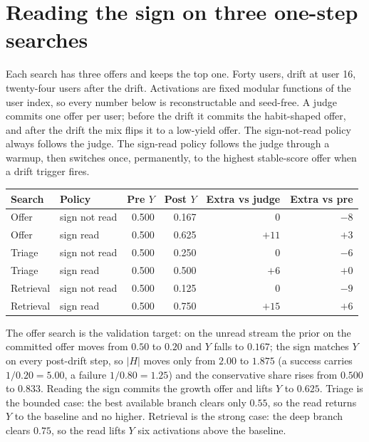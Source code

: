 \documentclass[11pt,a4paper]{article}
\begin{document}
\section{Reading the sign on three one-step searches}
Each search has three offers and keeps the top one.
Forty users, drift at user 16, twenty-four users after the drift.
Activations are fixed modular functions of the user index, so every number below is reconstructable and seed-free.
A judge commits one offer per user; before the drift it commits the habit-shaped offer, and after the drift the mix flips it to a low-yield offer.
The sign-not-read policy always follows the judge.
The sign-read policy follows the judge through a warmup, then switches once, permanently, to the highest stable-score offer when a drift trigger fires.
\begin{center}
\begin{tabular}{llrrrr}
\toprule
Search & Policy & Pre \(Y\) & Post \(Y\) & Extra vs judge & Extra vs pre \\
\midrule
Offer     & sign not read & 0.500 & 0.167 & 0    & \(-8\) \\
Offer     & sign read     & 0.500 & 0.625 & \(+11\) & \(+3\) \\
\addlinespace
Triage    & sign not read & 0.500 & 0.250 & 0    & \(-6\) \\
Triage    & sign read     & 0.500 & 0.500 & \(+6\)  & \(+0\) \\
\addlinespace
Retrieval & sign not read & 0.500 & 0.125 & 0    & \(-9\) \\
Retrieval & sign read     & 0.500 & 0.750 & \(+15\) & \(+6\) \\
\bottomrule
\end{tabular}
\end{center}
The offer search is the validation target: on the unread stream the prior on the committed offer moves from \(0.50\) to \(0.20\) and \(Y\) falls to \(0.167\); the sign matches \(Y\) on every post-drift step, so \(|H|\) moves only from \(2.00\) to \(1.875\) (a success carries \(1/0.20=5.00\), a failure \(1/0.80=1.25\)) and the conservative share rises from \(0.500\) to \(0.833\).
Reading the sign commits the growth offer and lifts \(Y\) to \(0.625\).
Triage is the bounded case: the best available branch clears only \(0.55\), so the read returns \(Y\) to the baseline and no higher.
Retrieval is the strong case: the deep branch clears \(0.75\), so the read lifts \(Y\) six activations above the baseline.
\end{document}
